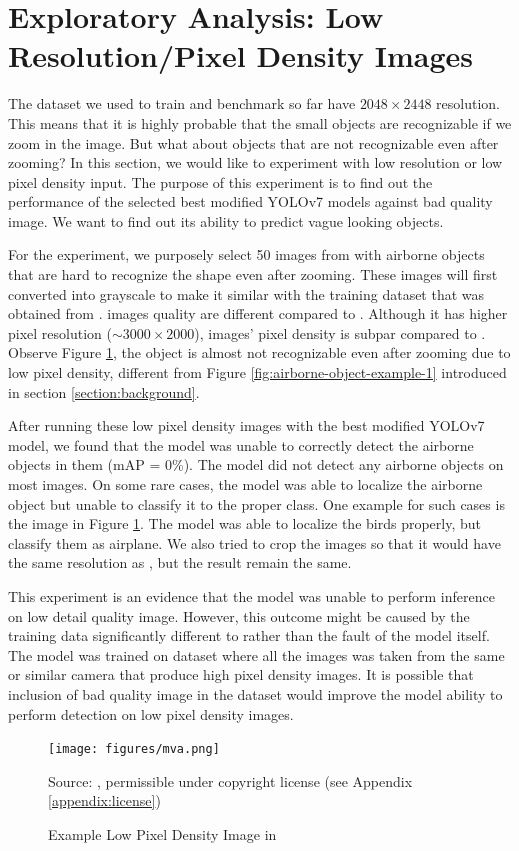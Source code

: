 \section{Exploratory Analysis: Low Resolution/Pixel Density Images}
The dataset we used to train and benchmark so far have $2048\times 2448$ resolution.
This means that it is highly probable that the small objects are recognizable if we zoom in the image.
But what about objects that are not recognizable even after zooming?
In this section, we would like to experiment with low resolution or low pixel density input.
The purpose of this experiment is to find out the performance of the selected best modified YOLOv7 models against
bad quality image. We want to find out its ability to predict vague looking objects.

For the experiment, we purposely select 50 images from \textcite{mva2023} with airborne objects that are hard to recognize the shape even after zooming.
These images will first converted into grayscale to make it similar with the training dataset that was obtained from \textcite{aot_dataset}.
\textcite{mva2023} images quality are different compared to \textcite{aot_dataset}.
Although it has higher pixel resolution ($\sim 3000\times 2000$), \textcite{mva2023} images' pixel density is subpar compared to \textcite{aot_dataset}.
Observe Figure \ref{fig:mva}, the object is almost not recognizable even after zooming due to low pixel density, different from Figure \ref{fig:airborne-object-example-1} introduced in section \ref{section:background}.

After running these low pixel density images with the best modified YOLOv7 model, we found that the model was unable to correctly detect the airborne objects in them (mAP = 0\%).
The model did not detect any airborne objects on most images. On some rare cases, the model was able to localize the airborne object but unable to classify it to the proper class.
One example for such cases is the image in Figure \ref{fig:mva}. The model was able to localize the birds properly, but classify them as airplane.
We also tried to crop the images so that it would have the same resolution as \textcite{aot_dataset}, but the result remain the same.

This experiment is an evidence that the model was unable to perform inference on low detail quality image.
However, this outcome might be caused by the training data significantly different to \textcite{mva2023} rather than the fault of the model itself.
The model was trained on dataset where all the images was taken from the same or similar camera that produce high pixel density images.
It is possible that inclusion of bad quality image in the dataset would improve the model ability to perform detection on low pixel density images.

\begin{figure}[btp]
  \centering
  \texttt{[image: figures/mva.png]}
  \caption*{Source: \textcite{mva2023}, permissible under copyright license (see Appendix \ref{appendix:license})}
  \caption{Example Low Pixel Density Image in \textcite{mva2023}}
  \label{fig:mva}
\end{figure}
